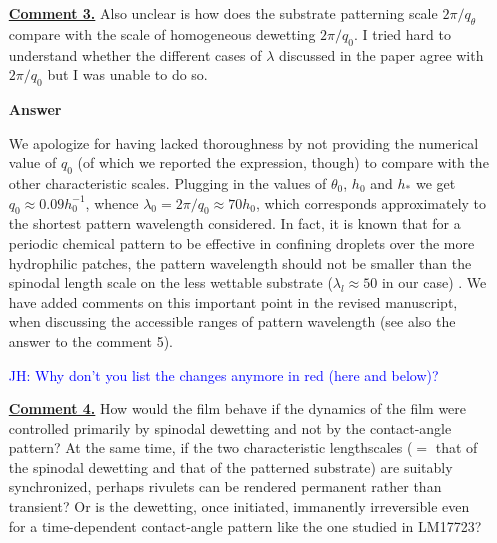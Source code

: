 \documentclass[12pt,english]{article}
\newcommand{\JH}[1]{\textcolor{blue}{JH: #1}}
\begin{document}
\begin{itemize}
{would deseve a dedicated and extended work which goes somehow beyond the goal of the present paper and of a typical PRL contribution.
We have added the new figure and the relative discussion on $\delta \theta$ in the
Supplementary Material.\\
We agree, also, that it is appropriate to add further details in the text, therefore we commented in the revised version on the choice of the checkerboard pattern saying that:\\
\\
\textcolor{red}{We decorate the substrate with a checkerboard pattern, a common choice that generalizes the broken homogeneity of the stripes to two 
directions~\cite{KarguptaLangmuir2003,Jalali2018,Nagayama2020,Das2020}.}

\JH{Is this enough?}
}

\item[ \textbf{\underline{Comment 3.}}]
{ 
Also unclear is how does the substrate patterning scale $2\pi/q_\theta$ compare with the scale of homogeneous dewetting $2\pi/q_0$.
I tried hard to understand whether the different cases of $\lambda$ discussed in the paper agree with $2\pi/q_0$ but I was unable to do so. 
}

\item[ \textbf{{Answer}}]
{
We apologize for having lacked thoroughness by not providing the numerical 
value of $q_0$ (of which we reported the expression, though) to compare with the 
other characteristic scales. Plugging in the values of $\theta_0$,
$h_0$ and $h_{\ast}$ we get $q_0 \approx 0.09 h_0^{-1}$, whence 
$\lambda_0 = 2\pi/q_0 \approx 70 h_0$, which corresponds approximately to the shortest pattern wavelength considered. 
In fact, it is known that for a periodic chemical pattern to be effective in 
confining droplets over the more hydrophilic patches, the pattern wavelength should 
not be smaller than the spinodal length scale on the less wettable substrate
($\lambda_l \approx 50$ in our case) \cite{KarguptaJCP2002,KarguptaLangmuir2000,Nisato1999,Karim1998}.
We have added comments on this important point in the revised manuscript, when discussing the accessible ranges of pattern wavelength (see also the answer to the comment 5).

\JH{Why don't you list the changes anymore in red (here and below)?}
}

\item[ \textbf{\underline{Comment 4.}}]
{  
How would the film behave if the dynamics of the film were controlled primarily by spinodal dewetting and not by the contact-angle pattern?
At the same time, if the two characteristic lengthscales ($=$ that of the spinodal dewetting and that of the patterned substrate) are suitably synchronized, perhaps rivulets can be rendered permanent rather than transient? Or is the dewetting, once initiated, immanently irreversible even for a
time-dependent contact-angle pattern like the one studied in LM17723?
}


\end{itemize}
\end{document}
